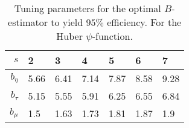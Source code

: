 \begin{table}[htbp!]
\begin{center}
{\small
\begin{tabular}{rllllll}
   \hline
$s$ & 2 & 3 & 4 & 5 & 6 & 7 \\ 
   \hline
$b_\eta$ & 5.66 & 6.41 & 7.14 & 7.87 & 8.58 & 9.28 \\ 
  $b_\tau$ & 5.15 & 5.55 & 5.91 & 6.25 & 6.55 & 6.84 \\ 
  $b_\mu$ & 1.5 & 1.63 & 1.73 & 1.81 & 1.87 & 1.9 \\ 
   \hline
\end{tabular}
}
\caption{Tuning parameters for the optimal $B$-estimator to yield $95\%$
  efficiency. For the Huber $\psi$-function.}
\label{tab:effBOptimal}
\end{center}
\end{table}
